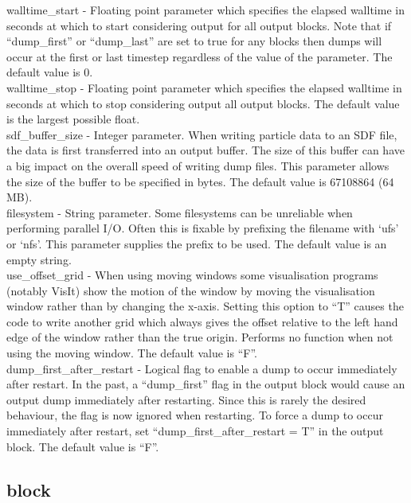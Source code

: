 {\emphtext walltime\_start} - Floating point parameter which specifies the
  elapsed walltime in seconds at which to start considering output for all
  output blocks. Note
  that if ``dump\_first'' or ``dump\_last'' are set to true for any blocks then
  dumps will occur at the first or last timestep regardless of the value of
  the 
  parameter.
  The default value is 0.\\

{\emphtext walltime\_stop} - Floating point parameter which specifies the
  elapsed walltime in seconds at which to stop considering output all
  output blocks. The default value is the largest possible float.\\

{\emphtext sdf\_buffer\_size} - Integer parameter. When writing particle data
to an SDF file, the data is first transferred into an output buffer. The
size of this buffer can have a big impact on the overall speed of writing
dump files. This parameter allows the size of the buffer to be specified in
bytes. The default value is 67108864 (64 MB).\\

{\emphtext filesystem} - String parameter. Some filesystems can be unreliable
when performing parallel I/O. Often this is fixable by prefixing the filename
with `ufs' or `nfs'. This parameter supplies the prefix to be used. The
default value is an empty string.\\

{\emphtext use\_offset\_grid} - When using moving windows some visualisation
programs (notably VisIt) show the motion of the window by moving the
visualisation window rather than by changing the x-axis. Setting this option to
``T'' causes the code to write another grid which always gives the offset
relative to the left hand edge of the window rather than the true origin.
Performs no function when not using the moving window. The default value
is ``F''.\\

{\emphtext dump\_first\_after\_restart} - Logical flag to enable a dump to
occur immediately after restart.
In the past, a ``dump\_first'' flag in the output block would cause
an output dump immediately after restarting. Since this is rarely
the desired behaviour, the flag is now ignored when restarting.
To force a dump to occur immediately after restart, set
``dump\_first\_after\_restart = T'' in the output block. The default value
is ``F''.


\subsection{\texorpdfstring
  { block}
  {           {dist\_fn} block}}
\label{sec:dist_fn_block}

